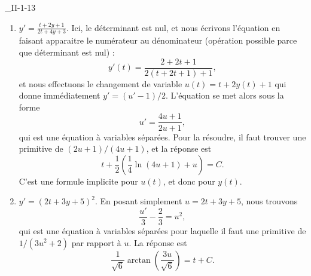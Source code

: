 \begin{corrige}{_II-1-13}
\begin{enumerate}
\item $y'=\frac{ t+2y+1 }{ 2t+4y+3 }$.
Ici, le déterminant est nul, et nous écrivons l'équation en faisant apparaitre le numérateur au dénominateur (opération possible parce que déterminant est nul) :
\begin{equation}
	y'(t)=\frac{ 2+2t+1 }{ 2(t+2t+1)+1 },
\end{equation}
et nous effectuons le changement de variable $u(t)=t+2y(t)+1$ qui donne immédiatement $y'=(u'-1)/2$. L'équation se met alors sous la forme
\begin{equation}
	u'=\frac{ 4u+1 }{ 2u+1 },
\end{equation}
qui est une équation à variables séparées. Pour la résoudre, il faut trouver une primitive de $(2u+1)/(4u+1)$, et la réponse est
\begin{equation}
	t+\frac{1}{ 2 }\left( \frac{1}{ 4 }\ln(4u+1)+u \right)=C.
\end{equation}
C'est une formule implicite pour $u(t)$, et donc pour $y(t)$.


\item $y'=(2t+3y+5)^2$.
En posant simplement $u=2t+3y+5$, nous trouvons 
\begin{equation}
	\frac{ u' }{ 3 }-\frac{ 2 }{ 3 }=u^2,
\end{equation}
qui est une équation à variables séparées pour laquelle il faut une primitive de $1/(3u^2+2)$ par rapport à $u$. La réponse est
\begin{equation}
	\frac{1}{ \sqrt{6} }\arctan\left( \frac{ 3u }{ \sqrt{6} } \right)=t+C.
\end{equation}



\end{enumerate}

\end{corrige}
